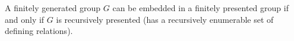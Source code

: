 A finitely generated group $G$ can be embedded in a finitely presented group if and only if $G$ is recursively presented (has a recursively enumerable set of defining relations).
